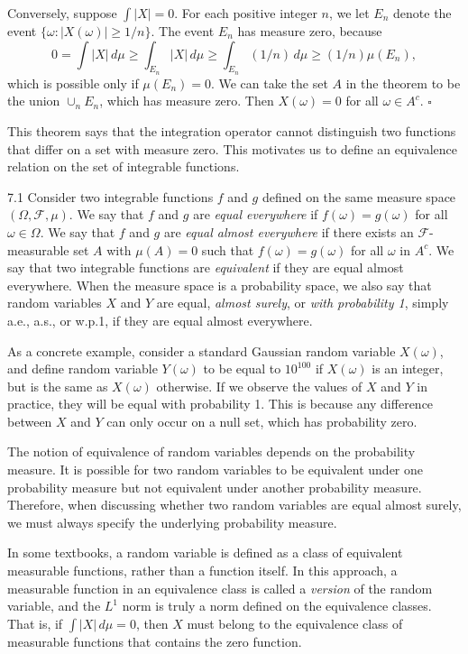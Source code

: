 Conversely, suppose $\int |X|=0$. For each positive integer $n$, we let $E_n$ denote the event $\{\omega : |X(\omega)|\ge 1/n\}$. The event $E_n$ has measure zero, because
\[
0 = \int |X|\, d\mu \ge \int_{E_n} |X|\, d\mu \ge \int_{E_n} (1/n)\, d\mu \ge (1/n)\mu(E_n),
\]
which is possible only if $\mu(E_n)=0$. We can take the set $A$ in the theorem to be the union $\cup_n E_n$, which has measure zero. Then $X(\omega)=0$ for all $\omega \in A^c$. \hfill $\square$

This theorem says that the integration operator cannot distinguish two functions that differ on a set with measure zero. This motivates us to define an equivalence relation on the set of integrable functions.

\begin{defbox}{7.1}
Consider two integrable functions $f$ and $g$ defined on the same measure space $(\Omega,\mathcal{F},\mu)$. We say that $f$ and $g$ are \textit{equal everywhere} if $f(\omega)=g(\omega)$ for all $\omega \in \Omega$. We say that $f$ and $g$ are \textit{equal almost everywhere} if there exists an $\mathcal{F}$-measurable set $A$ with $\mu(A)=0$ such that $f(\omega)=g(\omega)$ for all $\omega$ in $A^c$. We say that two integrable functions are \textit{equivalent} if they are equal almost everywhere. When the measure space is a probability space, we also say that random variables $X$ and $Y$ are equal, \textit{almost surely}, or \textit{with probability 1}, simply a.e., a.s., or w.p.1, if they are equal almost everywhere.
\end{defbox}

As a concrete example, consider a standard Gaussian random variable $X(\omega)$, and define random variable $Y(\omega)$ to be equal to $10^{100}$ if $X(\omega)$ is an integer, but is the same as $X(\omega)$ otherwise. If we observe the values of $X$ and $Y$ in practice, they will be equal with probability 1. This is because any difference between $X$ and $Y$ can only occur on a null set, which has probability zero.

The notion of equivalence of random variables depends on the probability measure. It is possible for two random variables to be equivalent under one probability measure but not equivalent under another probability measure. Therefore, when discussing whether two random variables are equal almost surely, we must always specify the underlying probability measure.

In some textbooks, a random variable is defined as a class of equivalent measurable functions, rather than a function itself. In this approach, a measurable function in an equivalence class is called a \textit{version} of the random variable, and the $L^1$ norm is truly a norm defined on the equivalence classes. That is, if $\int |X|\, d\mu = 0$, then $X$ must belong to the equivalence class of measurable functions that contains the zero function.

